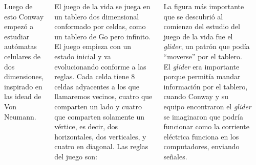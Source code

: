 \documentclass[20pt,margin=2.2cm,innermargin=-4.5in,blockverticalspace=-0.25in]{tikzposter}
\begin{document}
\begin{columns}
{{        }

        \vspace{5mm}
        Luego de esto Conway empez\'o a estudiar aut\'omatas celulares de dos dimensiones, inspirado en las idead de Von Neumann.

        El juego de la vida se juega en un tablero dos dimensional conformado por celdas, como un tablero de Go pero infinito. El juego empieza con un estado inicial y va evolucionando conforme a las reglas. Cada celda tiene 8 celdas adyacentes a los que llamaremos vecinos, cuatro que comparten un lado y cuatro que comparten solamente un v\'ertice, es decir, dos horizontales, dos verticales, y cuatro en diagonal. Las reglas del juego son:
        \vspace{7mm}
        

        \vspace{5mm}
        La figura más importante que se descubri\'o al comienzo del estudio del juego de la vida fue el \textit{glider}, un patr\'on que pod\'ia ``moverse'' por el tablero. El \textit{glider} era importante porque permit\'ia mandar informaci\'on por el tablero, cuando Conway y su equipo encontraron el \textit{glider} se imaginaron que podr\'ia funcionar como la corriente el\'ectrica funciona en los computadores, enviando se\~nales.
        \vspace{7mm}

}
\end{columns}
\end{document}
